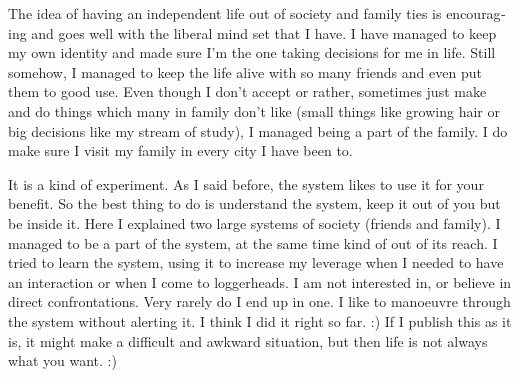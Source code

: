 \begin{english}
The idea of having an independent life out of society and family ties is encouraging and goes 
well with the liberal mind set that I have. I have managed to keep my own identity and made sure I'm the 
one taking decisions for me in life. Still somehow, I managed to keep the life alive with so many 
friends and even put them to good use. Even though I don't accept or rather, sometimes just make and do 
things which many in family don't like (small things like growing hair or big decisions like my 
stream of study), I managed being a part of the family. I do make sure I visit my family in every 
city I have been to. 

It is a kind of experiment. As I said before, the system likes to use it for your benefit. So the best 
thing to do is understand the system, keep it out of you but be inside it. Here I explained two 
large systems of society (friends and family). I managed to be a part of the system, at the same time 
kind of out of its reach. I tried to learn the system, using it to increase my leverage when I needed to have 
an interaction or when I come to loggerheads. I am not interested in, or believe in direct
confrontations. Very rarely do I end up in one. I like to manoeuvre through the system without 
alerting it. I think I did it right so far. :) If I publish this as it is, it might make a difficult 
and awkward situation, but then life is not always what you want. :)
\end{english}
\newpage 
